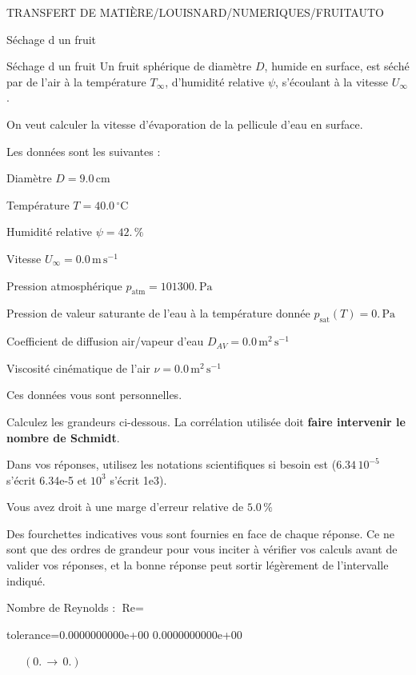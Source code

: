 \documentclass[12pt]{article}
\begin{document}
\begin{quiz}{TRANSFERT DE MATIÈRE/LOUISNARD/NUMERIQUES/FRUITAUTO}
\begin{cloze}{Séchage d un fruit}
\end{cloze} 


 \begin{cloze}{Séchage d un fruit} 
Un fruit sphérique de diamètre $D$, humide en surface, est séché par de l'air à la température $T_\infty$, d'humidité relative $\psi$, s'écoulant à la vitesse $U_\infty$.

On veut calculer la vitesse d'évaporation de la pellicule d'eau en surface.

 

Les données sont les suivantes :

 

Diamètre $D = 9.0\,  \mathrm{cm} $

Température $T = 40.0\,  \mathrm{^\circ\mathrm{C}} $

Humidité relative $\psi = 42.\, \% $

Vitesse $U_\infty = 0.0\,  \mathrm{m}\,  \mathrm{s}^{-1} $

Pression atmosphérique $p_{\text{atm}} = 101300.\,  \mathrm{Pa} $

Pression de valeur saturante de l’eau à la température donnée $p_{\text{sat}}(T) = 0.\,  \mathrm{Pa} $

Coefficient de diffusion air/vapeur d’eau $D_{AV} = 0.0\,  \mathrm{m}^{2}\,  \mathrm{s}^{-1} $

Viscosité cinématique de l’air $\nu = 0.0\,  \mathrm{m}^{2}\,  \mathrm{s}^{-1} $

Ces données vous sont personnelles.

 

Calculez les grandeurs ci-dessous. La corrélation utilisée doit \textbf{faire intervenir le nombre de Schmidt}.

Dans vos réponses, utilisez les notations scientifiques si besoin est ($6.34\, 10^{-5}$ s'écrit 6.34e-5 et $10^{3}$ s'écrit 1e3).

Vous avez droit à une marge d'erreur relative de $5.0\, \% $

Des fourchettes indicatives vous sont fournies en face de chaque réponse. Ce ne sont que des ordres de grandeur pour vous inciter à vérifier vos calculs avant de valider vos réponses, et la bonne réponse peut sortir légèrement de l'intervalle indiqué.

 

Nombre de Reynolds : $\text{Re} =  $
\begin{numerical}[points=1] 
\item[tolerance={0.0000000000e+00}] 0.0000000000e+00 
\end{numerical} 
 $\,$ 
 $ \quad (0. \, \rightarrow \, 0.) $ 


\end{cloze}
\end{quiz}
\end{document}
